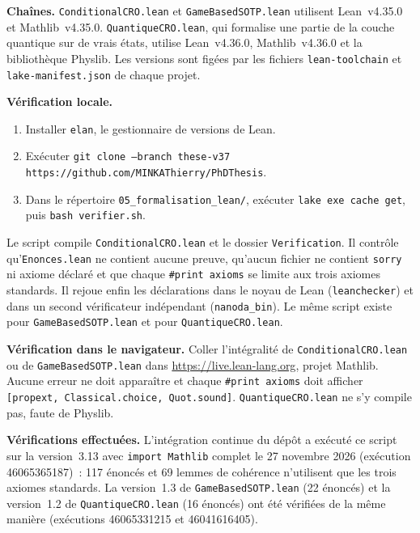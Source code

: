 \begin{sloppypar}
\noindent\textbf{Cha\^ines.} \texttt{ConditionalCRO.lean} et \texttt{GameBasedSOTP.lean}
utilisent Lean~v4.35.0 et Mathlib~v4.35.0. \texttt{QuantiqueCRO.lean}, qui formalise une
partie de la couche quantique sur de vrais \'etats, utilise Lean~v4.36.0, Mathlib~v4.36.0 et
la biblioth\`eque Physlib. Les versions sont fig\'ees par les fichiers
\texttt{lean-toolchain} et \texttt{lake-manifest.json} de chaque projet.

\medskip
\noindent\textbf{V\'erification locale.}
\begin{enumerate}
\item Installer \texttt{elan}, le gestionnaire de versions de Lean.
\item Ex\'ecuter \texttt{git clone --branch these-v37 https://github.com/MINKAThierry/PhDThesis}.
\item Dans le r\'epertoire \texttt{05\_formalisation\_lean/}, ex\'ecuter
      \texttt{lake exe cache get}, puis \texttt{bash verifier.sh}.
\end{enumerate}
Le script compile \texttt{ConditionalCRO.lean} et le dossier \texttt{Verification}. Il
contr\^ole qu'\texttt{Enonces.lean} ne contient aucune preuve, qu'aucun fichier ne contient
\texttt{sorry} ni axiome d\'eclar\'e et que chaque \texttt{\#print axioms} se limite aux trois
axiomes standards. Il rejoue enfin les d\'eclarations dans le noyau de Lean
(\texttt{leanchecker}) et dans un second v\'erificateur ind\'ependant (\texttt{nanoda\_bin}).
Le m\^eme script existe pour \texttt{GameBasedSOTP.lean} et pour \texttt{QuantiqueCRO.lean}.

\medskip
\noindent\textbf{V\'erification dans le navigateur.} Coller l'int\'egralit\'e de
\texttt{ConditionalCRO.lean} ou de \texttt{GameBasedSOTP.lean} dans
\url{https://live.lean-lang.org}, projet Mathlib. Aucune erreur ne doit appara\^itre et
chaque \texttt{\#print axioms} doit afficher \texttt{[propext, Classical.choice, Quot.sound]}.
\texttt{QuantiqueCRO.lean} ne s'y compile pas, faute de Physlib.

\medskip
\noindent\textbf{V\'erifications effectu\'ees.} L'int\'egration continue du d\'ep\^ot a ex\'ecut\'e
ce script sur la version~3.13 avec \texttt{import Mathlib} complet le 27 novembre 2026
(ex\'ecution 46065365187)~: 117 \'enonc\'es et 69 lemmes de coh\'erence n'utilisent que les trois
axiomes standards. La version~1.3 de \texttt{GameBasedSOTP.lean} (22 \'enonc\'es) et la
version~1.2 de \texttt{QuantiqueCRO.lean} (16 \'enonc\'es) ont \'et\'e v\'erifi\'ees de la m\^eme
mani\`ere (ex\'ecutions 46065331215 et 46041616405).
\end{sloppypar}

